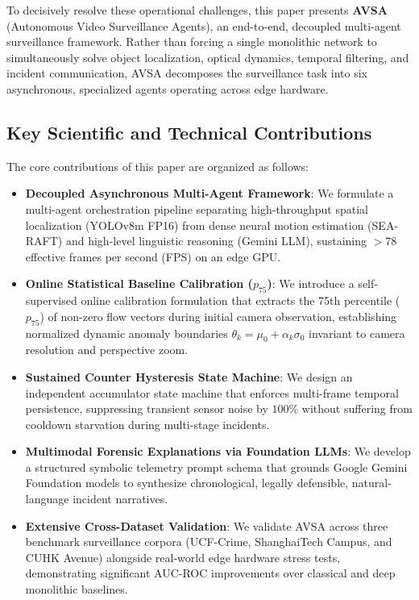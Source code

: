 \documentclass[conference]{IEEEtran}
\begin{document}
To decisively resolve these operational challenges, this paper presents \textbf{AVSA} (Autonomous Video Surveillance Agents), an end-to-end, decoupled multi-agent surveillance framework. Rather than forcing a single monolithic network to simultaneously solve object localization, optical dynamics, temporal filtering, and incident communication, AVSA decomposes the surveillance task into six asynchronous, specialized agents operating across edge hardware.

\subsection{Key Scientific and Technical Contributions}
The core contributions of this paper are organized as follows:
\begin{itemize}
    \item \textbf{Decoupled Asynchronous Multi-Agent Framework}: We formulate a multi-agent orchestration pipeline separating high-throughput spatial localization (YOLOv8m FP16) from dense neural motion estimation (SEA-RAFT) and high-level linguistic reasoning (Gemini LLM), sustaining $>78$ effective frames per second (FPS) on an edge GPU.
    \item \textbf{Online Statistical Baseline Calibration ($p_{75}$)}: We introduce a self-supervised online calibration formulation that extracts the 75th percentile ($p_{75}$) of non-zero flow vectors during initial camera observation, establishing normalized dynamic anomaly boundaries $\theta_k = \mu_0 + \alpha_k \sigma_0$ invariant to camera resolution and perspective zoom.
    \item \textbf{Sustained Counter Hysteresis State Machine}: We design an independent accumulator state machine that enforces multi-frame temporal persistence, suppressing transient sensor noise by $100\%$ without suffering from cooldown starvation during multi-stage incidents.
    \item \textbf{Multimodal Forensic Explanations via Foundation LLMs}: We develop a structured symbolic telemetry prompt schema that grounds Google Gemini Foundation models to synthesize chronological, legally defensible, natural-language incident narratives.
    \item \textbf{Extensive Cross-Dataset Validation}: We validate AVSA across three benchmark surveillance corpora (UCF-Crime, ShanghaiTech Campus, and CUHK Avenue) alongside real-world edge hardware stress tests, demonstrating significant AUC-ROC improvements over classical and deep monolithic baselines.
\end{itemize}
\end{document}
